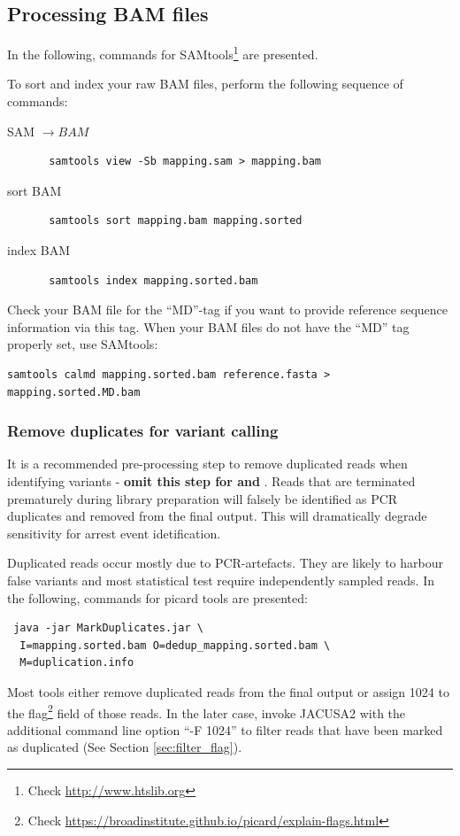 \documentclass[10pt,a4paper]{article} \usepackage[utf8]{inputenc}
\begin{document}
\subsection{Processing BAM files}
In the following, commands for SAMtools\footnote{Check \url{http://www.htslib.org}} are presented.

To sort and index your raw BAM files, perform the following sequence of commands:
\begin{description}
  \item[SAM $\rightarrow BAM$] \begin{verbatim} samtools view -Sb mapping.sam > mapping.bam
  \end{verbatim} \item[sort BAM] \begin{verbatim} samtools sort mapping.bam mapping.sorted
  \end{verbatim} \item[index BAM] \begin{verbatim} samtools index mapping.sorted.bam \end{verbatim}
\end{description}

Check your BAM file for the ``MD''-tag if you want to provide reference sequence information via this 
tag. When your BAM files do not have the ``MD'' tag properly set, use SAMtools:
\begin{verbatim}
samtools calmd mapping.sorted.bam reference.fasta > mapping.sorted.MD.bam
\end{verbatim}
\subsubsection{Remove duplicates for variant calling}
It is a recommended pre-processing step to remove duplicated reads when identifying variants -
\textbf{omit this step for \rtarrest and \lrtarrest}. Reads that are terminated prematurely during
library preparation will falsely be identified as PCR duplicates and removed from the final output.
This will dramatically degrade sensitivity for arrest event idetification.

Duplicated reads occur mostly due to PCR-artefacts. They are likely to harbour false variants and
most statistical test require independently sampled reads.
In the following, commands for picard tools are
presented:
\begin{verbatim} java -jar MarkDuplicates.jar \
  I=mapping.sorted.bam O=dedup_mapping.sorted.bam \
  M=duplication.info
\end{verbatim}
Most tools either remove duplicated reads from the final output or assign 1024 to the flag\footnote{
Check \url{https://broadinstitute.github.io/picard/explain-flags.html}} field of those reads. In the
later case, invoke JACUSA2 with the additional command line option ``-F 1024'' to filter reads that
have been marked as duplicated (See Section \ref{sec:filter_flag}).
\end{document}
